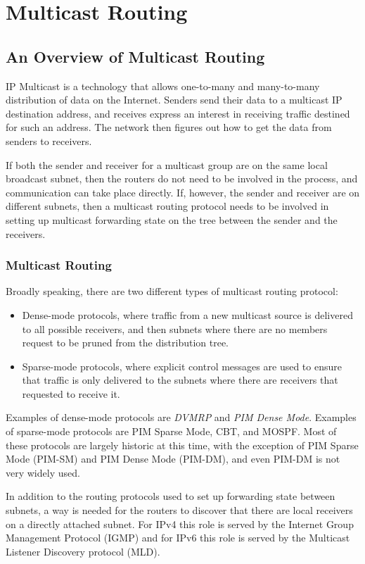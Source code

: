 %
%

\chapter{Multicast Routing}
\label{multicast}
\section{An Overview of Multicast Routing}

IP Multicast is a technology that allows one-to-many and many-to-many
distribution of data on the Internet.  Senders send their data to a
multicast IP destination address, and receives express an interest in
receiving traffic destined for such an address.  The network then
figures out how to get the data from senders to receivers.  

If both the sender and receiver for a multicast group are on the same
local broadcast subnet, then the routers do not need to be involved in
the process, and communication can take place directly.  If, however,
the sender and receiver are on different subnets, then a multicast
routing protocol needs to be involved in setting up multicast
forwarding state on the tree between the sender and the receivers.

\subsection{Multicast Routing}

Broadly speaking, there are two different types of multicast routing
protocol:
\begin{itemize}
\item Dense-mode protocols, where traffic from a new multicast source
  is delivered to all possible receivers, and then subnets where there
  are no members request to be pruned from the distribution tree.
\item Sparse-mode protocols, where explicit control messages are used
  to ensure that traffic is only delivered to the subnets where there
  are receivers that requested to receive it.
\end{itemize}
Examples of dense-mode protocols are {\it DVMRP} and {\it PIM Dense
Mode}.  Examples of sparse-mode protocols are PIM Sparse Mode, CBT,
and MOSPF.  Most of these protocols are largely historic at this time,
with the exception of PIM Sparse Mode (PIM-SM) and PIM Dense Mode
(PIM-DM), and even PIM-DM is not very widely used.

In addition to the routing protocols used to set up forwarding state
between subnets, a way is needed for the routers to discover that
there are local receivers on a directly attached subnet.  For IPv4
this role is served by the Internet Group Management Protocol (IGMP)
and for IPv6 this role is served by the Multicast Listener Discovery
protocol (MLD).

